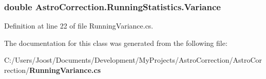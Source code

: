 \subsubsection[{Variance}]{\setlength{\rightskip}{0pt plus 5cm}double AstroCorrection.RunningStatistics.Variance\hspace{0.3cm}{\ttfamily  [get]}}\label{class_astro_correction_1_1_running_statistics_a86140be351d78a7b5ce75232ba630d4c}


Definition at line 22 of file RunningVariance.cs.

The documentation for this class was generated from the following file:\begin{DoxyCompactItemize}
\item 
C:/Users/Joost/Documents/Development/MyProjects/AstroCorrection/AstroCorrection/{\bf RunningVariance.cs}\end{DoxyCompactItemize}
